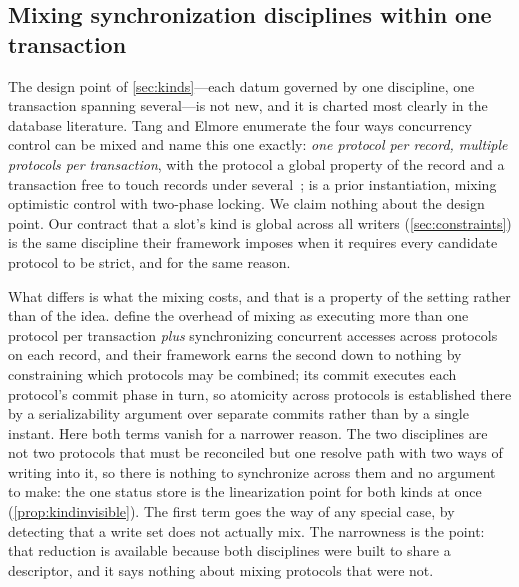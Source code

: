 \documentclass[11pt]{article}
\begin{document}
\subsection{Mixing synchronization disciplines within one transaction}
\label{sec:relmixed}

The design point of \cref{sec:kinds}---each datum governed by one discipline,
one transaction spanning several---is not new, and it is charted most clearly in
the database literature. Tang and Elmore enumerate the four ways concurrency
control can be mixed and name this one exactly: \emph{one protocol per record,
multiple protocols per transaction}, with the protocol a global property of the
record and a transaction free to touch records under
several~\citep{tang2018cormcc}; \citet{wang2016mocc} is a prior instantiation,
mixing optimistic control with two-phase locking. We claim nothing about the
design point. Our contract that a slot's kind is global across all writers
(\cref{sec:constraints}) is the same discipline their framework imposes when it
requires every candidate protocol to be strict, and for the same reason.

What differs is what the mixing costs, and that is a property of the setting
rather than of the idea.  define the overhead of mixing as
executing more than one protocol per transaction \emph{plus} synchronizing
concurrent accesses across protocols on each record, and their framework earns
the second down to nothing by constraining which protocols may be combined; its
commit executes each protocol's commit phase in turn, so atomicity across
protocols is established there by a serializability argument over separate
commits rather than by a single instant.
Here both
terms vanish for a narrower reason. The two disciplines are not two protocols
that must be reconciled but one resolve path with two ways of writing into it, so
there is nothing to synchronize across them and no argument to make: the one
status store is the linearization point for both kinds at once
(\cref{prop:kindinvisible}). The first term goes the way of any special case,
by detecting that a write set does not actually mix. The narrowness is the point:
that reduction is available because both disciplines were built to share a
descriptor, and it says nothing about mixing protocols that were not.
\end{document}
